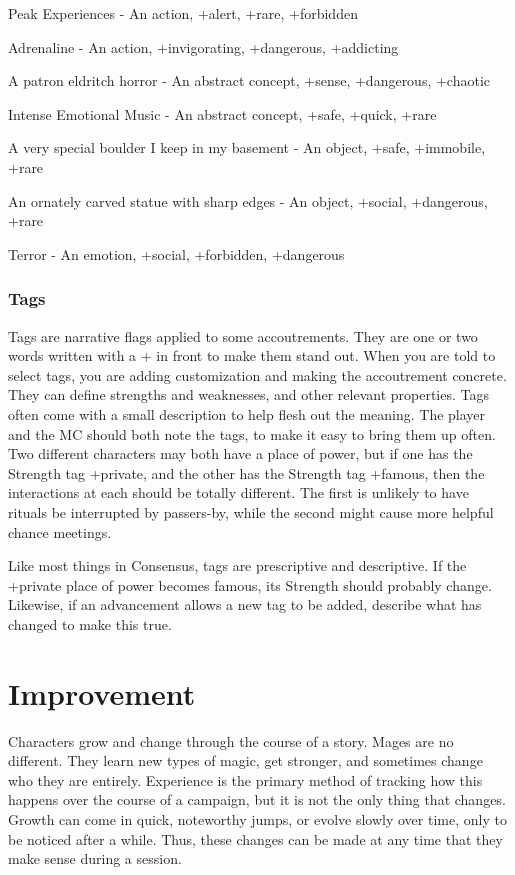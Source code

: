 \documentclass[10pt,twoside,openright]{memoir}
\begin{document}
Peak Experiences - An action, +alert, +rare, +forbidden

Adrenaline - An action, +invigorating, +dangerous, +addicting

A patron eldritch horror - An abstract concept, +sense, +dangerous,
+chaotic

Intense Emotional Music - An abstract concept, +safe, +quick, +rare

A very special boulder I keep in my basement - An object, +safe,
+immobile, +rare

An ornately carved statue with sharp edges - An object, +social,
+dangerous, +rare

Terror - An emotion, +social, +forbidden, +dangerous

\hypertarget{tags}{%
\subsection{Tags}\label{tags}}

Tags are narrative flags applied to some accoutrements. They are one or
two words written with a + in front to make them stand out. When you are
told to select tags, you are adding customization and making the
accoutrement concrete. They can define strengths and weaknesses, and
other relevant properties. Tags often come with a small description to
help flesh out the meaning. The player and the MC should both note the
tags, to make it easy to bring them up often. Two different characters
may both have a place of power, but if one has the Strength tag
+private, and the other has the Strength tag +famous, then the
interactions at each should be totally different. The first is unlikely
to have rituals be interrupted by passers-by, while the second might
cause more helpful chance meetings.

Like most things in Consensus, tags are prescriptive and descriptive. If
the +private place of power becomes famous, its Strength should probably
change. Likewise, if an advancement allows a new tag to be added,
describe what has changed to make this true.

\newpage

\hypertarget{improvement-1}{%
\chapter{Improvement}\label{improvement-1}}

Characters grow and change through the course of a story. Mages are no
different. They learn new types of magic, get stronger, and sometimes
change who they are entirely. Experience is the primary method of
tracking how this happens over the course of a campaign, but it is not
the only thing that changes. Growth can come in quick, noteworthy jumps,
or evolve slowly over time, only to be noticed after a while. Thus,
these changes can be made at any time that they make sense during a
session.
\end{document}
